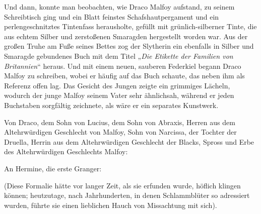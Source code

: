 Und dann, konnte man beobachten, wie Draco Malfoy aufstand, zu seinem Schreibtisch ging und ein Blatt feinstes Schafshautpergament und ein perlengeschnitztes Tintenfass herausholte, gefüllt mit grünlich-silberner Tinte, die aus echtem Silber und zerstoßenen Smaragden hergestellt worden war. Aus der großen Truhe am Fuße seines Bettes zog der Slytherin ein ebenfalls in Silber und Smaragde gebundenes Buch mit dem Titel
„\emph{Die Etikette der Familien von Britannien}“ heraus. Und mit einem neuen, sauberen Federkiel begann Draco Malfoy zu schreiben, wobei er häufig auf das Buch schaute, das neben ihm als Referenz offen lag. Das Gesicht des Jungen zeigte ein grimmiges Lächeln, wodurch der junge Malfoy seinem Vater sehr ähnlichsah, während er jeden Buchstaben sorgfältig zeichnete, als wäre er ein separates Kunstwerk.

\begin{writtenNote}
Von Draco, dem Sohn von Lucius, dem Sohn von Abraxis, Herren aus dem Altehrwürdigen Geschlecht von Malfoy, Sohn von Narcissa, der Tochter der Druella, Herrin aus dem Altehrwürdigen Geschlecht der Blacks, Spross und Erbe des Altehrwürdigen Geschlechts Malfoy:

An Hermine, die erste Granger:
\end{writtenNote}

(Diese Formalie hätte vor langer Zeit, als sie erfunden wurde, höflich klingen können; heutzutage, nach Jahrhunderten, in denen Schlammblüter so adressiert wurden, führte sie einen lieblichen Hauch von Missachtung mit sich).

